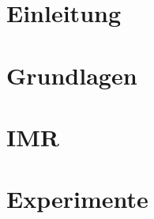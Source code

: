\documentclass[12pt,twoside]{article}
\theoremstyle{plain}
\theoremstyle{definition}
\theoremstyle{remark}
\begin{document}
\section{Einleitung}

\section{Grundlagen} 

\section{IMR}
\label{sec:methods}

\section{Experimente}


%


\end{document}
